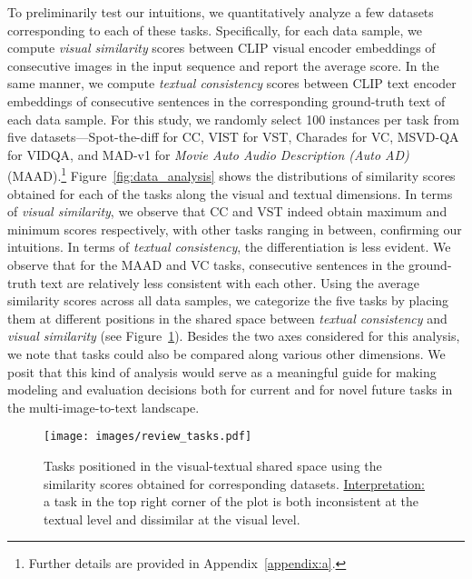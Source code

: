 To preliminarily test our intuitions, we quantitatively analyze a few datasets corresponding to each of these tasks. Specifically, for each data sample, we compute \textit{visual similarity} scores between CLIP \cite{clip} visual encoder embeddings of consecutive images in the input sequence and report the average score. In the same manner, we compute \textit{textual consistency} scores between CLIP text encoder embeddings of consecutive sentences in the corresponding ground-truth text of each data sample. For this study, we randomly select 100 instances per task from five datasets---\color{xkcdOrange}Spot-the-diff \color{black} \cite{cc_spot_the_diff} for \color{xkcdVividBlue}CC\color{black}, \color{xkcdOrange}VIST \color{black} \cite{vist} for \color{xkcdVividBlue}VST\color{black}, \color{xkcdOrange}Charades \color{black} \cite{vc_charades} for \color{xkcdVividBlue}VC\color{black}, \color{xkcdOrange}MSVD-QA \color{black} \cite{msvd_qa} for \color{xkcdVividBlue}VIDQA\color{black}, and \color{xkcdOrange}MAD-v1 \color{black} \cite{madv1} for \emph{Movie Auto Audio Description (Auto AD)} \cite{maad1} (\color{xkcdVividBlue}MAAD\color{black}).\footnote{Further details are provided in Appendix~\ref{appendix:a}.} Figure~\ref{fig:data_analysis} shows the distributions of similarity scores obtained for each of the tasks along the visual and textual dimensions. In terms of \textit{visual similarity}, we observe that \color{xkcdVividBlue}CC \color{black} and \color{xkcdVividBlue}VST \color{black} indeed obtain maximum and minimum scores respectively, with other tasks ranging in between, confirming our intuitions. In terms of \textit{textual consistency}, the differentiation is less evident. We observe that for the \color{xkcdVividBlue}MAAD \color{black} and \color{xkcdVividBlue}VC \color{black} tasks, consecutive sentences in the ground-truth text are relatively less consistent with each other. Using the average similarity scores across all data samples, we categorize the five tasks by placing them at different positions in the shared space between \emph{textual consistency} and \emph{visual similarity} (see Figure~\ref{fig:shared_space}). Besides the two axes considered for this analysis, we note that tasks could also be compared along various other dimensions. We posit that this kind of analysis would serve as a meaningful guide for making modeling and evaluation decisions both for current and for novel future tasks in the multi-image-to-text landscape.

\begin{figure}[hbtp]
  \centering
  \texttt{[image: images/review\_tasks.pdf]}
  \caption{Tasks positioned in the visual-textual shared space using the similarity scores obtained for corresponding datasets. \underline{Interpretation:} a task in the top right corner of the plot is both inconsistent at the textual level and dissimilar at the visual level.}
  \label{fig:shared_space}
\end{figure}